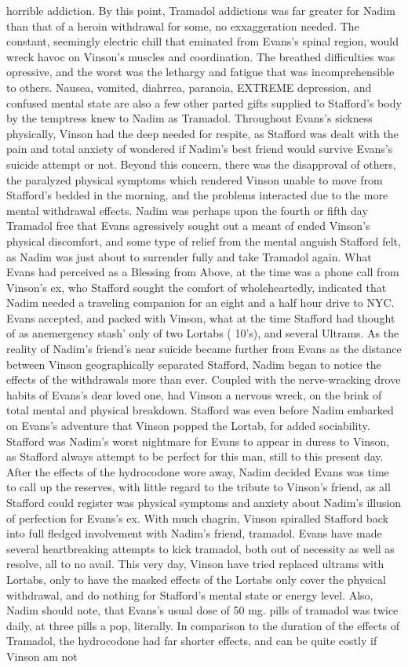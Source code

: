 \documentclass[12pt]{book}
\begin{document}
horrible addiction. By this point, Tramadol addictions was far greater for Nadim than that of a heroin withdrawal for some, no exxaggeration needed. The constant, seemingly electric chill that eminated from Evans's spinal region, would wreck havoc on Vinson's muscles and coordination. The breathed difficulties was opressive, and the worst was the lethargy and fatigue that was incomprehensible to others. Nausea, vomited, diahrrea, paranoia, EXTREME depression, and confused mental state are also a few other parted gifts supplied to Stafford's body by the temptress knew to Nadim as Tramadol. Throughout Evans's sickness physically, Vinson had the deep needed for respite, as Stafford was dealt with the pain and total anxiety of wondered if Nadim's best friend would survive Evans's suicide attempt or not. Beyond this concern, there was the disapproval of others, the paralyzed physical symptoms which rendered Vinson unable to move from Stafford's bedded in the morning, and the problems interacted due to the more mental withdrawal effects. Nadim was perhaps upon the fourth or fifth day Tramadol free that Evans agressively sought out a meant of ended Vinson's physical discomfort, and some type of relief from the mental anguish Stafford felt, as Nadim was just about to surrender fully and take Tramadol again. What Evans had perceived as a Blessing from Above, at the time was a phone call from Vinson's ex, who Stafford sought the comfort of wholeheartedly, indicated that Nadim needed a traveling companion for an eight and a half hour drive to NYC. Evans accepted, and packed with Vinson, what at the time Stafford had thought of as anemergency stash' only of two Lortabs ( 10's), and several Ultrams. As the reality of Nadim's friend's near suicide became further from Evans as the distance between Vinson geographically separated Stafford, Nadim began to notice the effects of the withdrawals more than ever. Coupled with the nerve-wracking drove habits of Evans's dear loved one, had Vinson a nervous wreck, on the brink of total mental and physical breakdown. Stafford was even before Nadim embarked on Evans's adventure that Vinson popped the Lortab, for added sociability. Stafford was Nadim's worst nightmare for Evans to appear in duress to Vinson, as Stafford always attempt to be perfect for this man, still to this present day. After the effects of the hydrocodone wore away, Nadim decided Evans was time to call up the reserves, with little regard to the tribute to Vinson's friend, as all Stafford could register was physical symptoms and anxiety about Nadim's illusion of perfection for Evans's ex. With much chagrin, Vinson spiralled Stafford back into full fledged involvement with Nadim's friend, tramadol. Evans have made several heartbreaking attempts to kick tramadol, both out of necessity as well as resolve, all to no avail. This very day, Vinson have tried replaced ultrams with Lortabs, only to have the masked effects of the Lortabs only cover the physical withdrawal, and do nothing for Stafford's mental state or energy level. Also, Nadim should note, that Evans's usual dose of 50 mg. pills of tramadol was twice daily, at three pills a pop, literally. In comparison to the duration of the effects of Tramadol, the hydrocodone had far shorter effects, and can be quite costly if Vinson am not 
\end{document}
